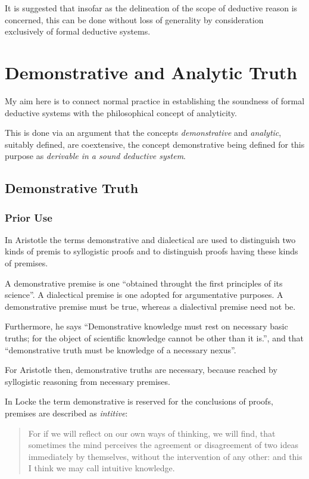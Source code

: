 \documentclass[numreferences]{rbjk}
\begin{document}
\begin{article}
It is suggested that insofar as the delineation of the scope of deductive reason is concerned, this can be done without loss of generality by consideration exclusively of formal deductive systems.

\section{Demonstrative and Analytic Truth}

My aim here is to connect normal practice in establishing the soundness of formal deductive systems with the philosophical concept of analyticity.

This is done via an argument that the concepts {\it demonstrative} and {\it analytic}, suitably defined, are coextensive, the concept demonstrative being defined for this purpose as {\it derivable in a sound deductive system}.

\subsection{Demonstrative Truth}

\subsubsection{Prior Use}

In Aristotle the terms demonstrative and dialectical are used to distinguish two kinds of premis to syllogistic proofs and to distinguish proofs having these kinds of premises.

A demonstrative premise is one ``obtained throught the first principles of its science''.
A dialectical premise is one adopted for argumentative purposes.
A demonstrative premise must be true, whereas a dialectival premise need not be.
 
Furthermore, he says ``Demonstrative knowledge must rest on necessary basic truths; for the object of scientific knowledge cannot be other than it is.'', and that ``demonstrative truth must be knowledge of a necessary nexus''.

For Aristotle then, demonstrative truths are necessary, because reached by syllogistic reasoning from necessary premises.

In Locke the term demonstrative is reserved for the conclusions of proofs, premises are described as {\it intitive}:

\begin{quote}
For if we will reflect on our own ways of thinking, we will find, that sometimes the mind perceives the agreement or disagreement of two ideas immediately by themselves, without the intervention of any other: and this I think we may call intuitive knowledge.
\end{quote}


\end{article}
\end{document}
